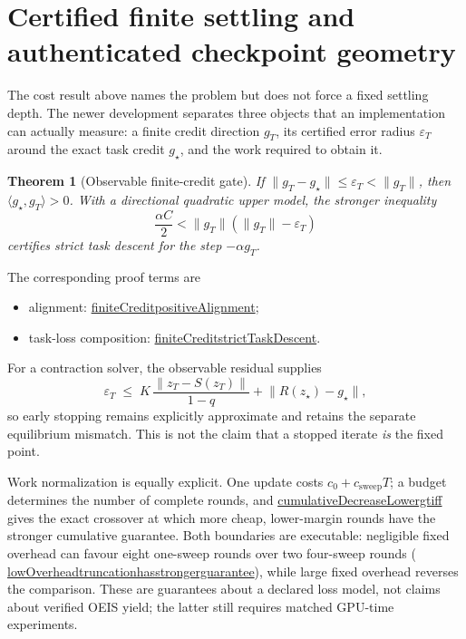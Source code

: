 \documentclass[11pt]{article}
\newtheorem{theorem}{Theorem}[section]
\newcommand{\leanname}[1]{{\scriptsize\ttfamily
  \def\_{\textunderscore\allowbreak}#1}}
\newcommand{\leancommit}{f3a31db36bb2f944312ee31c1d86c2758109e83a}
\newcommand{\leansource}[3]{%
  \href{https://github.com/zariuq/MeTTapedia/blob/\leancommit/#1\#L#2}{\leanname{#3}}}
\begin{document}
\section{Certified finite settling and authenticated checkpoint geometry}
\label{sec:finite-settling}

The cost result above names the problem but does not force a fixed settling depth.
The newer development separates three objects that an implementation can actually
measure: a finite credit direction $g_T$, its certified error radius $\varepsilon_T$
around the exact task credit $g_\star$, and the work required to obtain it.

\begin{theorem}[Observable finite-credit gate]
If $\lVert g_T-g_\star\rVert\leq\varepsilon_T<\lVert g_T\rVert$, then
$\langle g_\star,g_T\rangle>0$. With a directional quadratic upper model, the stronger
inequality
\[
  \frac{\alpha C}{2}
  < \lVert g_T\rVert(\lVert g_T\rVert-\varepsilon_T)
\]
certifies strict task descent for the step $-\alpha g_T$.
\end{theorem}

The corresponding proof terms are
\begin{itemize}
\item alignment:
\leansource{lean/mettapedia/Mettapedia/MachineLearning/NeuralNetworks/CreditTransport/WorkNormalizedTruncation.lean}{52}{finiteCredit\_positiveAlignment};
\item task-loss composition:
\leansource{lean/mettapedia/Mettapedia/MachineLearning/NeuralNetworks/CreditTransport/WorkNormalizedTruncation.lean}{68}{finiteCredit\_strictTaskDescent}.
\end{itemize}
For a contraction solver, the observable residual supplies
\[
\varepsilon_T\;\leq\;
K\,\frac{\lVert z_T-S(z_T)\rVert}{1-q}
 + \lVert R(z_\star)-g_\star\rVert ,
\]
so early stopping remains explicitly approximate and retains the separate equilibrium
mismatch. This is not the claim that a stopped iterate \emph{is} the fixed point.

Work normalization is equally explicit. One update costs
$c_0+c_{\mathrm{sweep}}T$; a budget determines the number of complete rounds, and
\leansource{lean/mettapedia/Mettapedia/MachineLearning/NeuralNetworks/CreditTransport/WorkNormalizedTruncation.lean}{226}{cumulativeDecreaseLower\_gt\_iff}
gives the exact crossover at which more cheap, lower-margin rounds have the stronger
cumulative guarantee. Both boundaries are executable: negligible fixed overhead can
favour eight one-sweep rounds over two four-sweep rounds
(\leansource{lean/mettapedia/Mettapedia/MachineLearning/NeuralNetworks/CreditTransport/WorkNormalizedTruncation.lean}{241}{lowOverhead\_truncation\_has\_stronger\_guarantee}),
while large fixed overhead reverses the comparison. These are guarantees about a declared
loss model, not claims about verified OEIS yield; the latter still requires matched
GPU-time experiments.
\end{document}
